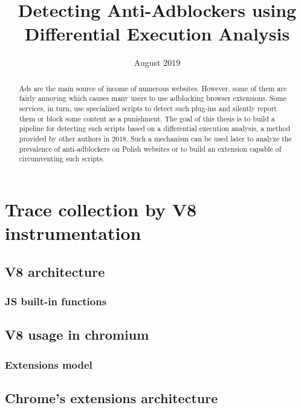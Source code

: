 \documentclass[en]{pracamgr}
\title{Detecting Anti-Adblockers using Differential Execution Analysis}
\date{August 2019}
\begin{document}
\maketitle

\begin{abstract}
Ads are the main source of income of numerous websites. 
However, some of them are fairly annoying which causes many users to use adblocking browser extensions. 
Some services, in turn, use specialized scripts to detect such plug-ins 
and silently report them or block some content as a punishment. 
The goal of this thesis is to build a pipeline for detecting such scripts based on a differential execution analysis, 
a method provided by other authors in 2018. 
Such a mechanism can be used later to analyze the prevalence of anti-adblockers 
on Polish websites or to build an extension capable of circumventing such scripts.

\end{abstract}

\tableofcontents











\chapter{Trace collection by V8 instrumentation}
\label{v8-instrumentation}

\section{V8 architecture}
\subsection{JS built-in functions}
\section{V8 usage in chromium}
\label{v8-in-chrome}

\subsection{Extensions model}
\section{Chrome's extensions architecture}
\end{document}
